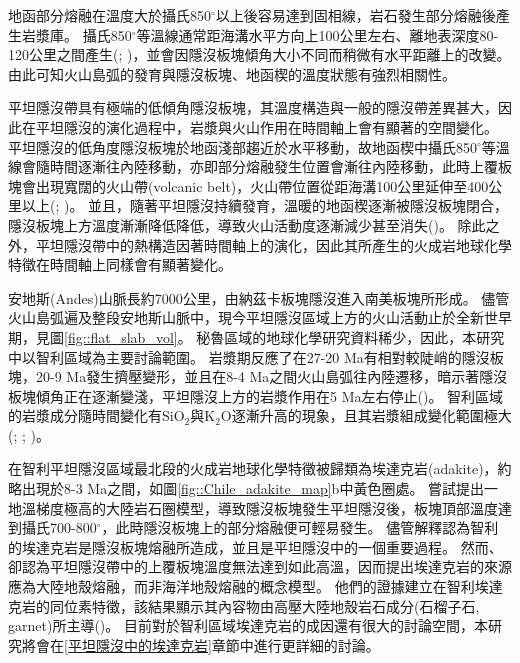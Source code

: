 地函部分熔融在溫度大於攝氏850$^{\circ}$以上後容易達到固相線，岩石發生部分熔融後產生岩漿庫。
攝氏850$^{\circ}$等溫線通常距海溝水平方向上100公里左右、離地表深度80-120公里之間產生(\citealp{peacock1990fluid}; \citealp{hyndman2003serpentinization})，並會因隱沒板塊傾角大小不同而稍微有水平距離上的改變。
由此可知火山島弧的發育與隱沒板塊、地函楔的溫度狀態有強烈相關性。

平坦隱沒帶具有極端的低傾角隱沒板塊，其溫度構造與一般的隱沒帶差異甚大，因此在平坦隱沒的演化過程中，岩漿與火山作用在時間軸上會有顯著的空間變化。
平坦隱沒的低角度隱沒板塊於地函淺部趨近於水平移動，故地函楔中攝氏850$^{\circ}$等溫線會隨時間逐漸往內陸移動，亦即部分熔融發生位置會漸往內陸移動，此時上覆板塊會出現寬闊的火山帶(volcanic belt)，火山帶位置從距海溝100公里延伸至400公里以上(\citealp{Gutscher2000A}; \citealp{Manea2017})。
並且，隨著平坦隱沒持續發育，溫暖的地函楔逐漸被隱沒板塊閉合，隱沒板塊上方溫度漸漸降低降低，導致火山活動度逐漸減少甚至消失(\citealp{Gutscher2000Bcan})。
除此之外，平坦隱沒帶中的熱構造因著時間軸上的演化，因此其所產生的火成岩地球化學特徵在時間軸上同樣會有顯著變化。

安地斯(Andes)山脈長約7000公里，由納茲卡板塊隱沒進入南美板塊所形成。
儘管火山島弧遍及整段安地斯山脈中，現今平坦隱沒區域上方的火山活動止於全新世早期，見圖\ref{fig::flat_slab_vol}。
秘魯區域的地球化學研究資料稀少，因此，本研究中以智利區域為主要討論範圍。
岩漿期反應了在27-20 Ma有相對較陡峭的隱沒板塊，20-9 Ma發生擠壓變形，並且在8-4 Ma之間火山島弧往內陸遷移，暗示著隱沒板塊傾角正在逐漸變淺，平坦隱沒上方的岩漿作用在5 Ma左右停止(\citealp{kay2002magmatism})。
智利區域的岩漿成分隨時間變化有SiO$_2$與K$_2$O逐漸升高的現象，且其岩漿組成變化範圍極大(\citealp{kay1988tertiary}; \citealp{kay2002magmatism}; \citealp{goss2013andean})。

在智利平坦隱沒區域最北段的火成岩地球化學特徵被歸類為埃達克岩(adakite)，約略出現於8-3 Ma之間，如圖\ref{fig::Chile_adakite_map}b中黃色圈處。
\citealp{Gutscher2000Bcan}嘗試提出一地溫梯度極高的大陸岩石圈模型，導致隱沒板塊發生平坦隱沒後，板塊頂部溫度達到攝氏700-800$^{\circ}$，此時隱沒板塊上的部分熔融便可輕易發生。
儘管\citealp{Gutscher2000Bcan}解釋認為智利的埃達克岩是隱沒板塊熔融所造成，並且是平坦隱沒中的一個重要過程。
然而\citealp{kay2002magmatism}、\citealp{goss2013andean}卻認為平坦隱沒帶中的上覆板塊溫度無法達到如此高溫，因而提出埃達克岩的來源應為大陸地殼熔融，而非海洋地殼熔融的概念模型。
他們的證據建立在智利埃達克岩的同位素特徵，該結果顯示其內容物由高壓大陸地殼岩石成分(石榴子石, garnet)所主導(\citealp{kay2002magmatism})。
目前對於智利區域埃達克岩的成因還有很大的討論空間，本研究將會在\ref{平坦隱沒中的埃達克岩}章節中進行更詳細的討論。

